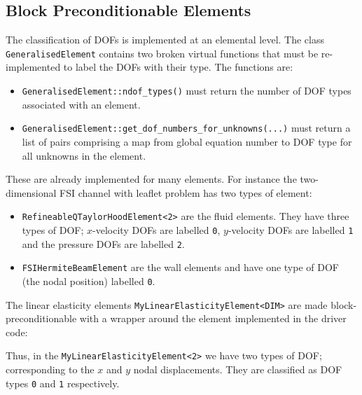 \subsection{Block Preconditionable Elements\label{sec:block_preconditionable_elements}}
The classification of DOFs is implemented at an elemental level. The class \verb+GeneralisedElement+ contains two broken virtual functions that must be re-implemented to label the DOFs with their type. The functions are:

\begin{itemize}
\item \verb+GeneralisedElement::ndof_types()+ must return the number of DOF types associated with an element.
\item \verb+GeneralisedElement::get_dof_numbers_for_unknowns(...)+ must return a list of pairs comprising a map from global equation number to DOF type for all unknowns in the element.
\end{itemize}
These are already implemented for many elements. For instance the two-dimensional FSI channel with leaflet problem has two types of element:
\begin{itemize}
\item \verb+RefineableQTaylorHoodElement<2>+ are the fluid elements. They have three types of DOF; $x$-velocity DOFs are labelled \verb+0+, $y$-velocity DOFs are labelled \verb+1+ and the pressure DOFs are labelled \verb+2+.
\item \verb+FSIHermiteBeamElement+ are the wall elements and have one type of
  DOF (the nodal position) labelled \verb+0+.
\end{itemize}
The linear elasticity elements \verb+MyLinearElasticityElement<DIM>+ are made block-preconditionable with a wrapper
around the element implemented in the driver code:
\lstset{numberfirstline=true,numberstyle=\scriptsize,breaklines=true, numbers=left, stepnumber=2, frame=single,basicstyle=\ttfamily\scriptsize, showstringspaces=false, language=C++}

Thus, in the \verb+MyLinearElasticityElement<2>+ we have two types of DOF; corresponding to the $x$ and $y$ nodal displacements. They are classified as DOF types \verb+0+ and \verb+1+ respectively.

